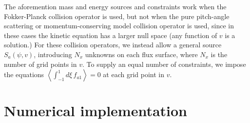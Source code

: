\documentclass[12pt]{revtex4}
\begin{document}
The aforemention mass and energy sources and constraints work when the Fokker-Planck collision operator
is used, 
but not when the pure pitch-angle scattering or momentum-conserving model collision operator is used, since in these cases the kinetic equation has a larger null space
(any function of $v$ is a solution.)
For these collision operators, we instead allow a general source $S_a(\psi,v)$,
introducing $N_x$ unknowns on each flux surface, where $N_x$ is the number of grid points in $v$.
To supply an equal number of constraints, we impose the equations $\left< \int_{-1}^1 d\xi\, f_{a1}\right>=0$
at each grid point in $v$.

\section{Numerical implementation}
\label{sec:numerics}
\end{document}
